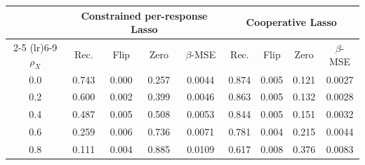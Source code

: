 \begin{tabular}{ccccccccc}
\toprule
 & \multicolumn{4}{c}{Constrained per-response Lasso} & \multicolumn{4}{c}{Cooperative Lasso} \\
\cmidrule(lr){2-5} \cmidrule(lr){6-9}
$\rho_X$ & Rec. & Flip & Zero & $\beta$-MSE & Rec. & Flip & Zero & $\beta$-MSE \\
\midrule
0.0 & 0.743 & 0.000 & 0.257 & 0.0044 & 0.874 & 0.005 & 0.121 & 0.0027 \\
0.2 & 0.600 & 0.002 & 0.399 & 0.0046 & 0.863 & 0.005 & 0.132 & 0.0028 \\
0.4 & 0.487 & 0.005 & 0.508 & 0.0053 & 0.844 & 0.005 & 0.151 & 0.0032 \\
0.6 & 0.259 & 0.006 & 0.736 & 0.0071 & 0.781 & 0.004 & 0.215 & 0.0044 \\
0.8 & 0.111 & 0.004 & 0.885 & 0.0109 & 0.617 & 0.008 & 0.376 & 0.0083 \\
\bottomrule
\end{tabular}